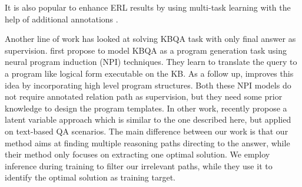 It is also popular to enhance ERL results by using multi-task learning with the help of additional annotations \cite{DBLP:conf/aaai/DengXLYDFLS19,DBLP:conf/ijcai/ShaoGBJCLD19}. 

Another line of work has looked at solving KBQA task with only final answer as supervision.  first propose to model KBQA as a program generation task using neural program induction (NPI) techniques. They learn to translate the query to a program like logical form executable on the KB. As a follow up,  improves this idea by incorporating high level program structures. Both these NPI models do not require annotated relation path as supervision, but they need some prior knowledge to design the program templates. In other work,  recently propose a latent variable approach which is similar to the one described here, but applied on text-based QA scenarios. The main difference between our work is that our method aims at finding multiple reasoning paths directing to the answer, while their method only focuses on extracting one optimal solution. We employ inference during training to filter our irrelevant paths, while they use it to identify the optimal solution as training target.
